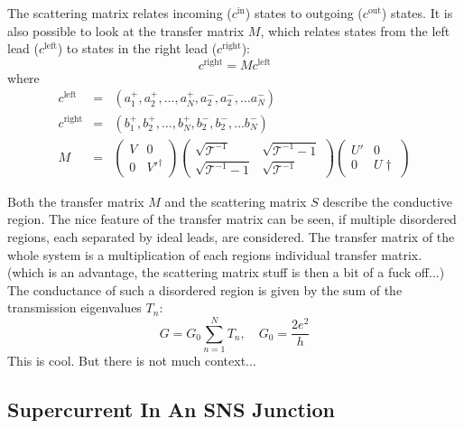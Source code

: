 The scattering matrix relates incoming ($c^\text{in}$) states to outgoing ($c^\text{out}$) states. It is also possible to look at the transfer matrix $M$, which relates states from the left lead ($c^\text{left}$) to states in the right lead ($c^\text{right}$):
\begin{equation}
c^\text{right} = M c^\text{left}
\end{equation}
where 
\begin{eqnarray}
c^\text{left} &=& \left( a_1^+, a_2^+, \dots, a_N^+, a_2^-, a_2^-, \dots a_N^-\right) \\
c^\text{right} &=& \left( b_1^+, b_2^+, \dots, b_N^+, b_2^-, b_2^-, \dots b_N^-\right) \\
M &=& \begin{pmatrix} V & 0 \\ 0 & V'^\dagger \end{pmatrix} \begin{pmatrix} \sqrt{\mathcal{T}^{-1}} & \sqrt{\mathcal{T}^{-1} -1} \\ \sqrt{\mathcal{T}^{-1} -1} & \sqrt{\mathcal{T}^{-1}}\end{pmatrix} \begin{pmatrix} U' & 0 \\ 0 & U\dagger \end{pmatrix}
\end{eqnarray}

Both the transfer matrix $M$ and the scattering matrix $S$ describe the conductive region. The nice feature of the transfer matrix can be seen, if multiple disordered regions, each separated by ideal leads, are considered. The transfer matrix of the whole system is a multiplication of each regions individual transfer matrix. (which is an advantage, the scattering matrix stuff is then a bit of a fuck off...)
The conductance of such a disordered region is given by the sum of the transmission eigenvalues $T_n$:
\begin{equation}
G = G_0 \sum_{n=1}^N T_n, \quad G_0 = \frac{2e^2}{h}
\end{equation}
This is cool. But there is not much context...

\subsection{Supercurrent In An SNS Junction}

